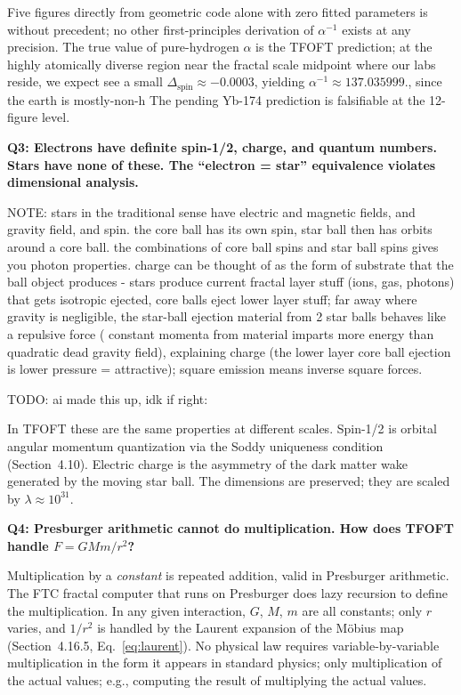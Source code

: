 \documentclass[11pt,a4paper]{article}
\begin{document}
Five figures directly from geometric code alone with zero fitted parameters is without precedent; no other first-principles derivation of $\alpha^{-1}$ exists at any precision. The true value of pure-hydrogen $\alpha$ is the TFOFT prediction; at the highly atomically diverse region near the fractal scale midpoint where our labs reside, we expect see a small 
$\Delta_{\text{spin}} \approx -0.0003$, yielding $\alpha^{-1} \approx 137.035999$., since the earth is mostly-non-h
The pending Yb-174 prediction is falsifiable at the 12-figure level.

\begin{mdframed}
\textbf{Q3: Electrons have definite spin-1/2, charge, and quantum numbers. Stars
have none of these. The ``electron = star'' equivalence violates dimensional analysis.}
\end{mdframed}

NOTE: stars in the traditional sense have electric and magnetic fields, and gravity field, and spin. the core ball has its own spin, star ball then has orbits around a core ball. the combinations of core ball spins and star ball spins gives you photon properties. charge can be thought of as the form of substrate that the ball object produces - stars produce current fractal layer stuff (ions, gas, photons) that gets isotropic ejected, core balls eject lower layer stuff; far away where gravity is negligible, the star-ball ejection material from 2 star balls behaves like a repulsive force ( constant momenta from material imparts more energy than quadratic dead gravity field), explaining charge (the lower layer core ball ejection is lower pressure = attractive); square emission means inverse square forces. 

TODO: ai made this up, idk if right:

In TFOFT these are the same properties at different scales. Spin-1/2 is orbital
angular momentum quantization via the Soddy uniqueness condition (Section~4.10).
Electric charge is the asymmetry of the dark matter wake generated by the moving star
ball. The dimensions are preserved; they are scaled by $\lambda \approx 10^{31}$.

\begin{mdframed}
\textbf{Q4: Presburger arithmetic cannot do multiplication. How does TFOFT handle
$F = GMm/r^2$?}
\end{mdframed}

Multiplication by a \emph{constant} is repeated addition, valid in Presburger arithmetic. The FTC fractal computer that runs on Presburger does lazy recursion to define the multiplication. In any given interaction, $G$, $M$, $m$ are all constants; only $r$
varies, and $1/r^2$ is handled by the Laurent expansion of the M\"obius map
(Section~4.16.5, Eq.~\eqref{eq:laurent}). No physical law requires variable-by-variable multiplication in the form it appears in standard physics; only multiplication of the actual values; e.g., computing the result of multiplying the actual values.
\end{document}
